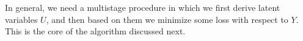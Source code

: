 
In general, we need a
multistage procedure in which we first derive latent variables $U$, and
then based on them we minimize some loss with respect to $Y$. This is the
core of the algorithm discussed next.


